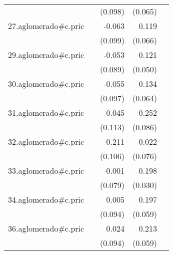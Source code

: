 {\begin{longtable}{l*{4}{D{.}{.}{-1}}}
            &                     &     (0.098)         &     (0.065)         &                     \\
\addlinespace
27.aglomerado#c.pric&                     &      -0.063         &       0.119         &                     \\
            &                     &     (0.099)         &     (0.066)         &                     \\
\addlinespace
29.aglomerado#c.pric&                     &      -0.053         &       0.121\sym{*}  &                     \\
            &                     &     (0.089)         &     (0.050)         &                     \\
\addlinespace
30.aglomerado#c.pric&                     &      -0.055         &       0.134\sym{*}  &                     \\
            &                     &     (0.097)         &     (0.064)         &                     \\
\addlinespace
31.aglomerado#c.pric&                     &       0.045         &       0.252\sym{**} &                     \\
            &                     &     (0.113)         &     (0.086)         &                     \\
\addlinespace
32.aglomerado#c.pric&                     &      -0.211\sym{*}  &      -0.022         &                     \\
            &                     &     (0.106)         &     (0.076)         &                     \\
\addlinespace
33.aglomerado#c.pric&                     &      -0.001         &       0.198\sym{***}&                     \\
            &                     &     (0.079)         &     (0.030)         &                     \\
\addlinespace
34.aglomerado#c.pric&                     &       0.005         &       0.197\sym{***}&                     \\
            &                     &     (0.094)         &     (0.059)         &                     \\
\addlinespace
36.aglomerado#c.pric&                     &       0.024         &       0.213\sym{***}&                     \\
            &                     &     (0.094)         &     (0.059)         &                     \\

\end{longtable}}
